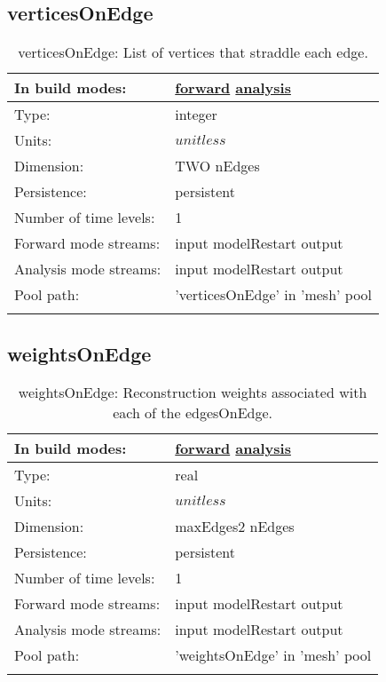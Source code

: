 \subsection[verticesOnEdge]{verticesOnEdge}
\label{subsec:var_sec_mesh_verticesOnEdge}
\begin{center}
\begin{longtable}{| p{2.0in} | p{4.0in} |}
        \hline 
        In build modes: & \hyperref[subsec:forward_var_tab_mesh]{forward} \hyperref[subsec:analysis_var_tab_mesh]{analysis} \\
        \hline 
        Type: & integer \\
        \hline 
        Units: & $unitless$ \\
        \hline 
        Dimension: & TWO nEdges \\
        \hline 
        Persistence: & persistent \\
        \hline 
        Number of time levels: & 1 \\
        \hline 
		 Forward mode streams: &  input modelRestart output \\
        \hline 
		 Analysis mode streams: &  input modelRestart output \\
        \hline 
            Pool path: & 'verticesOnEdge' in 'mesh' pool
 \\
		 \hline 
    \caption{verticesOnEdge: List of vertices that straddle each edge.}
\end{longtable}
\end{center}
\subsection[weightsOnEdge]{weightsOnEdge}
\label{subsec:var_sec_mesh_weightsOnEdge}
\begin{center}
\begin{longtable}{| p{2.0in} | p{4.0in} |}
        \hline 
        In build modes: & \hyperref[subsec:forward_var_tab_mesh]{forward} \hyperref[subsec:analysis_var_tab_mesh]{analysis} \\
        \hline 
        Type: & real \\
        \hline 
        Units: & $unitless$ \\
        \hline 
        Dimension: & maxEdges2 nEdges \\
        \hline 
        Persistence: & persistent \\
        \hline 
        Number of time levels: & 1 \\
        \hline 
		 Forward mode streams: &  input modelRestart output \\
        \hline 
		 Analysis mode streams: &  input modelRestart output \\
        \hline 
            Pool path: & 'weightsOnEdge' in 'mesh' pool
 \\
		 \hline 
    \caption{weightsOnEdge: Reconstruction weights associated with each of the edgesOnEdge.}
\end{longtable}
\end{center}
